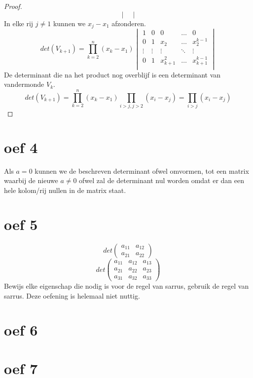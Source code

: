 \documentclass[lineaire_algebra_oplossingen.tex]{subfiles}
\begin{document}
\begin{proof}
\[\begin{vmatrix}
\end{vmatrix}
\]
In elke rij $j \neq 1$ kunnen we $x_j-x_1$ afzonderen.
\[
det(V_{k+1}) =
\prod_{k=2}^n(x_k-x_1)
\begin{vmatrix}
1 & 0 & 0 & \hdots & 0\\
0 & 1 & x_2 & \hdots & x_2^{k-1}\\
\vdots &\vdots &\vdots & \ddots & \vdots \\
0 & 1 & x_{k+1}^2  & \hdots & x_{k+1}^{k-1}\\
\end{vmatrix}
\]
De determinant die na het product nog overblijf is een determinant van vandermonde $V_k$.
\[
det(V_{k+1}) =
\prod_{k=2}^n(x_k-x_1)
\prod_{i>j,j>2}(x_i-x_j)
= \prod_{i>j}(x_i-x_j)
\]
\end{proof}

\section{oef 4}
Als $a=0$ kunnen we de beschreven determinant ofwel omvormen, tot een matrix waarbij de nieuwe $a \neq 0$ ofwel zal de determinant nul worden omdat er dan een hele kolom/rij nullen in de matrix staat. 

\section{oef 5}
\[
det\left(
\begin{matrix}
a_{11} & a_{12}\\
a_{21} & a_{22}
\end{matrix}
\right)
\]
\[
det\left(
\begin{matrix}
a_{11} & a_{12} & a_{13}\\
a_{21} & a_{22} & a_{23}\\
a_{31} & a_{32} & a_{33}
\end{matrix}
\right)
\]
Bewijs elke eigenschap die nodig is voor de regel van sarrus, gebruik de regel van sarrus. Deze oefening is helemaal niet nuttig.

\section{oef 6}
\section{oef 7}
\end{document}
